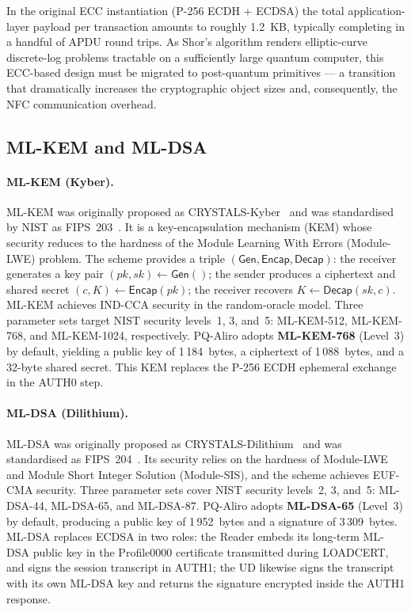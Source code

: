 In the original ECC instantiation (P-256 ECDH + ECDSA) the total application-layer
payload per transaction amounts to roughly 1.2~KB, typically completing in a
handful of APDU round trips.  As Shor's algorithm renders elliptic-curve
discrete-log problems tractable on a sufficiently large quantum computer, this
ECC-based design must be migrated to post-quantum primitives --- a transition
that dramatically increases the cryptographic object sizes and, consequently,
the NFC communication overhead.


\subsection{ML-KEM and ML-DSA}
\label{sec:pqc}

\paragraph{ML-KEM (Kyber).}
ML-KEM was originally proposed as CRYSTALS-Kyber~\cite{EuroSP:BDKLLSSSS18} and
was standardised by NIST as FIPS~203~\cite{NIST:FIPS203}.  It is a
key-encapsulation mechanism (KEM) whose security reduces to the hardness of the
Module Learning With Errors (Module-LWE) problem.  The scheme provides a triple
$(\mathsf{Gen}, \mathsf{Encap}, \mathsf{Decap})$: the receiver generates a key
pair $(\mathit{pk}, \mathit{sk}) \leftarrow \mathsf{Gen}()$; the sender
produces a ciphertext and shared secret $(c, K) \leftarrow \mathsf{Encap}(\mathit{pk})$;
the receiver recovers $K \leftarrow \mathsf{Decap}(\mathit{sk}, c)$.
ML-KEM achieves IND-CCA security in the random-oracle model.  Three parameter
sets target NIST security levels~1, 3, and~5:
ML-KEM-512, ML-KEM-768, and ML-KEM-1024, respectively.
PQ-Aliro adopts \textbf{ML-KEM-768} (Level~3) by default,
yielding a public key of 1\,184~bytes, a ciphertext of 1\,088~bytes, and a
32-byte shared secret.  This KEM replaces the P-256 ECDH ephemeral exchange
in the AUTH0 step.

\paragraph{ML-DSA (Dilithium).}
ML-DSA was originally proposed as CRYSTALS-Dilithium~\cite{TCHES:DKLLSSS18}
and was standardised as FIPS~204~\cite{NIST:FIPS204}.  Its security relies on
the hardness of Module-LWE and Module Short Integer Solution (Module-SIS), and
the scheme achieves EUF-CMA security.  Three parameter sets cover NIST security
levels~2, 3, and~5: ML-DSA-44, ML-DSA-65, and ML-DSA-87.
PQ-Aliro adopts \textbf{ML-DSA-65} (Level~3) by default, producing a public
key of 1\,952~bytes and a signature of 3\,309~bytes.  ML-DSA replaces ECDSA in
two roles: the Reader embeds its long-term ML-DSA public key in the Profile0000
certificate transmitted during LOADCERT, and signs the session transcript in
AUTH1; the UD likewise signs the transcript with its own ML-DSA key and returns
the signature encrypted inside the AUTH1 response.

